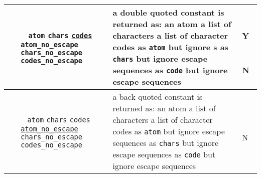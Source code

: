 \begin{tabular}{|L{4.5cm}|C{2.8cm}|L{6.2cm}|C{0,6cm}|}
~
\linebreak
{} &
  ~
\linebreak
  \texttt{atom}
\linebreak
  \texttt{chars}
\linebreak
  \texttt{\underline{codes}}
\linebreak
  \texttt{atom\_no\_escape}
\linebreak
  \texttt{chars\_no\_escape}
\linebreak
  \texttt{codes\_no\_escape} &
    a double quoted constant is returned as:
\linebreak
    an atom
\linebreak
    a list of characters
\linebreak
    a list of character codes
\linebreak
    as \texttt{atom} but ignore s
\linebreak
    as \texttt{chars} but ignore escape sequences
\linebreak
    as \texttt{code} but ignore escape sequences &
      ~
\linebreak
      Y
\linebreak
    ~
\linebreak
    ~
\linebreak
      N
 \\

\hline

~
\linebreak
{} &
  ~
\linebreak
  \texttt{atom}
\linebreak
  \texttt{chars}
\linebreak
  \texttt{codes}
\linebreak
  \texttt{\underline{atom\_no\_escape}}
\linebreak
  \texttt{chars\_no\_escape}
\linebreak
  \texttt{codes\_no\_escape} &
    a back quoted constant is returned as:
\linebreak
    an atom
\linebreak
    a list of characters
\linebreak
    a list of character codes
\linebreak
    as \texttt{atom} but ignore escape sequences
\linebreak
    as \texttt{chars} but ignore escape sequences
\linebreak
    as \texttt{code} but ignore escape sequences &
      ~
\linebreak
      N
 \\
\hline


\end{tabular}
